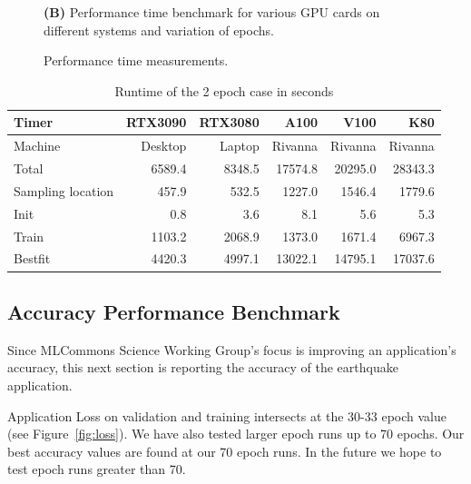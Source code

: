 \documentclass[utf8]{FrontiersinVancouver} %
\begin{document}
{\begin{figure}[p]
  {\bf (B)} Performance time benchmark for various GPU cards on
  different systems and variation of epochs.
    
  \caption{Performance time measurements.}
  \label{fig:performance-projection}
\end{figure}

    
\begin{table}[htb]
    \caption{Runtime of the 2 epoch case in seconds}
    \label{tab:2-epoch-case}
    \begin{center}
    {\footnotesize              

          \begin{tabular}{lrrrrr}
            Timer             & RTX3090 & RTX3080 & A100    & V100    & K80     \\
            \hline
            Machine           & Desktop & Laptop  & Rivanna & Rivanna & Rivanna \\
            Total             & 6589.4  & 8348.5  & 17574.8 & 20295.0 & 28343.3 \\
            Sampling location &  457.9  &  532.5  &  1227.0 &  1546.4 &  1779.6 \\
            Init              &    0.8  &    3.6  &    8.1  &     5.6 &     5.3 \\
            Train             & 1103.2  & 2068.9  &  1373.0 &  1671.4 &  6967.3 \\
            Bestfit           & 4420.3  & 4997.1  & 13022.1 & 14795.1 & 17037.6 \\
            \hline
          \end{tabular}

    }
    \end{center}
\end{table}


\subsection{Accuracy Performance Benchmark}
\label{sec:perf-accuracy}



Since MLCommons Science Working Group's focus is improving an
application’s accuracy, this next section is reporting the accuracy of
the earthquake application.

Application Loss on validation and training intersects at the 30-33
epoch value (see Figure~\ref{fig:loss}). We have also tested larger
epoch runs up to 70 epochs. Our best accuracy values are found at our
70 epoch runs. In the future we hope to test epoch runs greater than
70.


}
\end{document}
